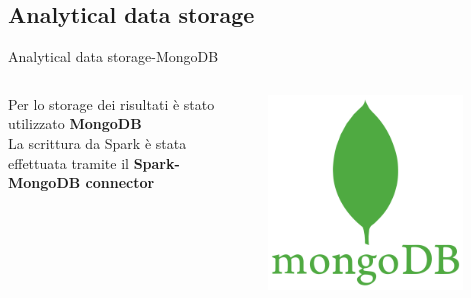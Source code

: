 \documentclass[13pt,aspectratio=169,t,xcolor=table]{beamer}
\begin{document}
\subsection{Analytical data storage}

\begin{frame}{Analytical data storage-MongoDB}
    \begin{columns}
    
            Per lo storage dei risultati è stato utilizzato \textbf{MongoDB} \\
            \vspace{0.2cm}
            La scrittura da Spark è stata effettuata tramite il \textbf{Spark-MongoDB connector}
        
            \begin{minipage}{0.5\textwidth}
                \raggedleft
                \includegraphics[width=0.8\textwidth]{res/mongodb_icon.png}
            \end{minipage}
    \end{columns}


\end{frame}
\end{document}

